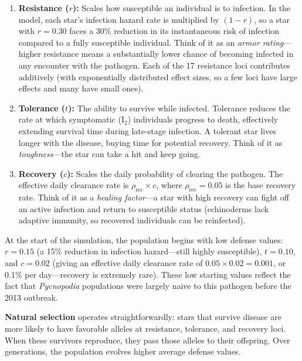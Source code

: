 \documentclass[11pt]{article}
\begin{document}
\begin{enumerate}[leftmargin=2em]
    \item \textbf{Resistance ($r$):} Scales how susceptible an individual is to infection. In the model, each star's infection hazard rate is multiplied by $(1 - r)$, so a star with $r = 0.30$ faces a 30\% reduction in its instantaneous risk of infection compared to a fully susceptible individual. Think of it as an \textit{armor rating}---higher resistance means a substantially lower chance of becoming infected in any encounter with the pathogen. Each of the 17 resistance loci contributes additively (with exponentially distributed effect sizes, so a few loci have large effects and many have small ones).

    \item \textbf{Tolerance ($t$):} The ability to survive while infected. Tolerance reduces the rate at which symptomatic (I$_2$) individuals progress to death, effectively extending survival time during late-stage infection. A tolerant star lives longer with the disease, buying time for potential recovery. Think of it as \textit{toughness}---the star can take a hit and keep going.

    \item \textbf{Recovery ($c$):} Scales the daily probability of clearing the pathogen. The effective daily clearance rate is $\rho_{\text{rec}} \times c$, where $\rho_{\text{rec}} = 0.05$ is the base recovery rate. Think of it as a \textit{healing factor}---a star with high recovery can fight off an active infection and return to susceptible status (echinoderms lack adaptive immunity, so recovered individuals can be reinfected).
\end{enumerate}

At the start of the simulation, the population begins with low defense values: $r = 0.15$ (a 15\% reduction in infection hazard---still highly susceptible), $t = 0.10$, and $c = 0.02$ (giving an effective daily clearance rate of $0.05 \times 0.02 = 0.001$, or 0.1\% per day---recovery is extremely rare). These low starting values reflect the fact that \textit{Pycnopodia} populations were largely naive to this pathogen before the 2013 outbreak.

\textbf{Natural selection} operates straightforwardly: stars that survive disease are more likely to have favorable alleles at resistance, tolerance, and recovery loci. When these survivors reproduce, they pass those alleles to their offspring. Over generations, the population evolves higher average defense values.
\end{document}
